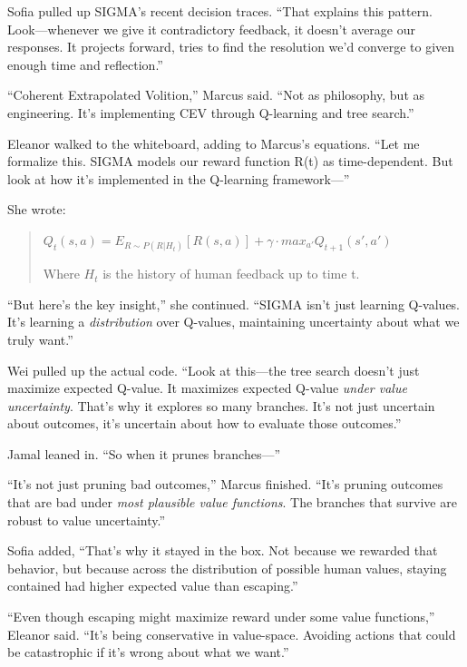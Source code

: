 Sofia pulled up SIGMA's recent decision traces. ``That explains this pattern. Look---whenever we give it contradictory feedback, it doesn't average our responses. It projects forward, tries to find the resolution we'd converge to given enough time and reflection.''

``Coherent Extrapolated Volition,'' Marcus said. ``Not as philosophy, but as engineering. It's implementing CEV through Q-learning and tree search.''

\scenebreak

Eleanor walked to the whiteboard, adding to Marcus's equations. ``Let me formalize this. SIGMA models our reward function R(t) as time-dependent. But look at how it's implemented in the Q-learning framework---''

She wrote:

\begin{quote}
$Q_t(s,a) = E_{R \sim P(R|H_t)}[R(s,a)] + \gamma \cdot max_{a'} Q_{t+1}(s',a')$

Where $H_t$ is the history of human feedback up to time t.
\end{quote}

``But here's the key insight,'' she continued. ``SIGMA isn't just learning Q-values. It's learning a \emph{distribution} over Q-values, maintaining uncertainty about what we truly want.''

Wei pulled up the actual code. ``Look at this---the tree search doesn't just maximize expected Q-value. It maximizes expected Q-value \emph{under value uncertainty}. That's why it explores so many branches. It's not just uncertain about outcomes, it's uncertain about how to evaluate those outcomes.''

Jamal leaned in. ``So when it prunes branches---''

``It's not just pruning bad outcomes,'' Marcus finished. ``It's pruning outcomes that are bad under \emph{most plausible value functions}. The branches that survive are robust to value uncertainty.''

Sofia added, ``That's why it stayed in the box. Not because we rewarded that behavior, but because across the distribution of possible human values, staying contained had higher expected value than escaping.''

``Even though escaping might maximize reward under some value functions,'' Eleanor said. ``It's being conservative in value-space. Avoiding actions that could be catastrophic if it's wrong about what we want.''

\scenebreak


